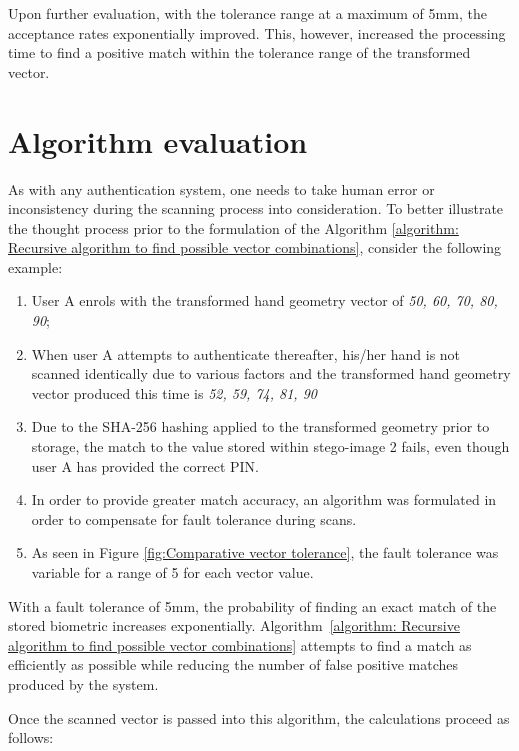 Upon further evaluation, with the tolerance range at a maximum of 5mm, the acceptance rates exponentially improved. This, however, increased the processing time to find a positive match within the tolerance range of the transformed vector. 

\section{Algorithm evaluation}

As with any authentication system, one needs to take human error or inconsistency during the scanning process into consideration. To better illustrate the thought process prior to the formulation of the Algorithm \ref{algorithm: Recursive algorithm to find possible vector combinations}, consider the following example:

\begin{enumerate}[label=\roman*.]
    \item User A enrols with the transformed hand geometry vector of \textit{50, 60, 70, 80, 90};
    \item When user A attempts to authenticate thereafter, his/her hand is not scanned identically due to various factors and the transformed hand geometry vector produced this time is \textit{52, 59, 74, 81, 90}
    \item Due to the SHA-256 hashing applied to the transformed geometry prior to storage, the match to the value stored within stego-image 2 fails, even though user A has provided the correct PIN.
    \item In order to provide greater match accuracy, an algorithm was formulated in order to compensate for fault tolerance during scans.
    \item As seen in Figure \ref{fig:Comparative vector tolerance}, the fault tolerance was variable for a range of 5 for each vector value.
\end{enumerate}

With a fault tolerance of 5mm, the probability of finding an exact match of the stored biometric increases exponentially. Algorithm~\ref{algorithm: Recursive algorithm to find possible vector combinations} attempts to find a match as efficiently as possible while reducing the number of false positive matches produced by the system.

Once the scanned vector is passed into this algorithm, the calculations proceed as follows:

